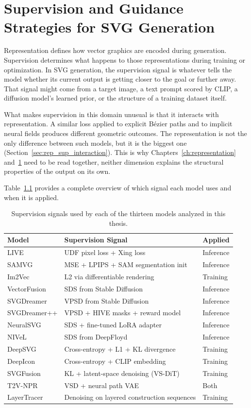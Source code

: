 \chapter{Supervision and Guidance Strategies for SVG Generation}
\label{ch:supervision}

Representation defines how vector graphics are encoded during generation. 
Supervision determines what happens to those representations during training or optimization.
In SVG generation, the supervision signal is whatever tells the model whether its current output 
is getting closer to the goal or further away. That signal might come from a target image, 
a text prompt scored by CLIP, a diffusion model's learned prior, or the structure of a training dataset itself.

What makes supervision in this domain unusual is that it interacts with representation. 
A similar loss applied to explicit B\'{e}zier paths and to implicit neural fields 
produces different geometric outcomes. The representation is not the only difference between such models, 
but it is the biggest one (Section~\ref{sec:rep_sup_interaction}). 
This is why Chapters~\ref{ch:representation} and~\ref{ch:supervision} need to be read together, 
neither dimension explains the structural properties of the output on its own.

Table~\ref{tab:supervision_overview} provides a complete overview of which signal each model uses and when it is applied.

\begin{table}[htbp]
\centering
\caption{Supervision signals used by each of the thirteen models 
analyzed in this thesis.}
\label{tab:supervision_overview}
\begin{tabular}{l l l}
\hline
\textbf{Model} & \textbf{Supervision Signal} & \textbf{Applied} \\
\hline
LIVE & UDF pixel loss + Xing loss & Inference \\
SAMVG & MSE + LPIPS + SAM segmentation init & Inference \\
Im2Vec & L2 via differentiable rendering & Training \\
VectorFusion & SDS from Stable Diffusion & Inference \\
SVGDreamer & VPSD from Stable Diffusion & Inference \\
SVGDreamer++ & VPSD + HIVE masks + reward model & Inference \\
NeuralSVG & SDS + fine-tuned LoRA adapter & Inference \\
NIVeL & SDS from DeepFloyd & Inference \\
DeepSVG & Cross-entropy + L1 + KL divergence & Training \\
DeepIcon & Cross-entropy + CLIP embedding & Training \\
SVGFusion & KL + latent-space denoising (VS-DiT) & Training \\
T2V-NPR & VSD + neural path VAE & Both \\
LayerTracer & Denoising on layered construction sequences & Training \\
\hline
\end{tabular}
\end{table}


